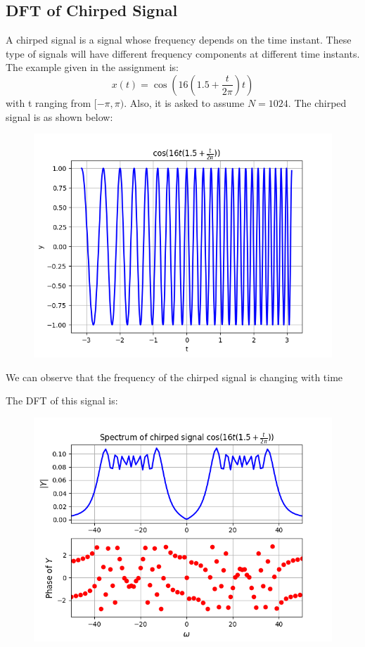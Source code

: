\documentclass[12pt, a4paper]{article}
\begin{document}
\subsection{DFT of Chirped Signal}
A chirped signal is a signal whose frequency depends on the time instant. These type of signals will have different frequency components at different time instants. The example given in the assignment is:
\begin{equation*}
    x(t) = \cos(16(1.5 + \frac{t}{2\pi})t)
\end{equation*}
with t ranging from $[-\pi,\pi)$. Also, it is asked to assume $N=1024$. The chirped signal is as shown below:
\begin{figure}[H]
    \centering
    \includegraphics[scale = 0.8]{Figure_13.png}
    \label{fig:sample}
\end{figure}
\begin{center}
    We can observe that the frequency of the chirped signal is changing with time
\end{center}
The DFT of this signal is:
\begin{figure}[H]
    \centering
    \includegraphics[scale = 0.8]{Figure_14.png}
    \label{fig:sample}
\end{figure}
\end{document}
